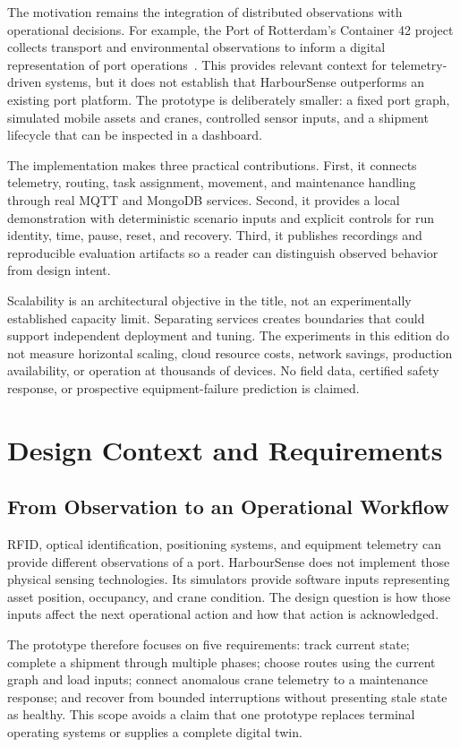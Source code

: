 \documentclass[journal]{IEEEtran}
\begin{document}
The motivation remains the integration of distributed observations with operational decisions. For example, the Port of Rotterdam's Container 42 project collects transport and environmental observations to inform a digital representation of port operations~\citep{rotterdam}. This provides relevant context for telemetry-driven systems, but it does not establish that HarbourSense outperforms an existing port platform. The prototype is deliberately smaller: a fixed port graph, simulated mobile assets and cranes, controlled sensor inputs, and a shipment lifecycle that can be inspected in a dashboard.

The implementation makes three practical contributions. First, it connects telemetry, routing, task assignment, movement, and maintenance handling through real MQTT and MongoDB services. Second, it provides a local demonstration with deterministic scenario inputs and explicit controls for run identity, time, pause, reset, and recovery. Third, it publishes recordings and reproducible evaluation artifacts so a reader can distinguish observed behavior from design intent.

Scalability is an architectural objective in the title, not an experimentally established capacity limit. Separating services creates boundaries that could support independent deployment and tuning. The experiments in this edition do not measure horizontal scaling, cloud resource costs, network savings, production availability, or operation at thousands of devices. No field data, certified safety response, or prospective equipment-failure prediction is claimed.

\section{Design Context and Requirements}
\subsection{From Observation to an Operational Workflow}
RFID, optical identification, positioning systems, and equipment telemetry can provide different observations of a port. HarbourSense does not implement those physical sensing technologies. Its simulators provide software inputs representing asset position, occupancy, and crane condition. The design question is how those inputs affect the next operational action and how that action is acknowledged.

The prototype therefore focuses on five requirements: track current state; complete a shipment through multiple phases; choose routes using the current graph and load inputs; connect anomalous crane telemetry to a maintenance response; and recover from bounded interruptions without presenting stale state as healthy. This scope avoids a claim that one prototype replaces terminal operating systems or supplies a complete digital twin.
\end{document}
